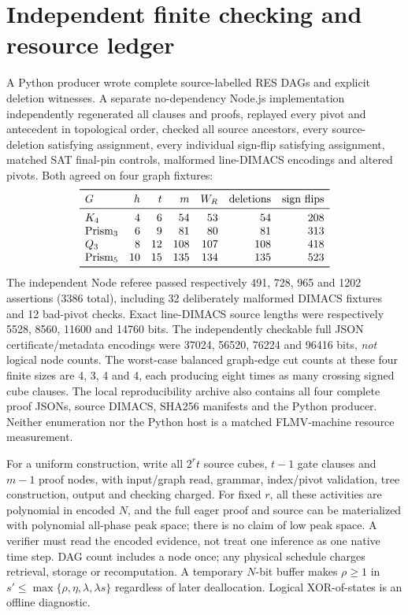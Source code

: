 \documentclass[11pt]{article}
\begin{document}
\section*{Independent finite checking and resource ledger}
A Python producer wrote complete source-labelled RES DAGs and explicit deletion witnesses. A separate no-dependency Node.js implementation independently regenerated all clauses and proofs, replayed every pivot and antecedent in topological order, checked all source ancestors, every source-deletion satisfying assignment, every individual sign-flip satisfying assignment, matched SAT final-pin controls, malformed line-DIMACS encodings and altered pivots. Both agreed on four graph fixtures:
\[
\begin{array}{lrrrrrr}
\toprule
G & h&t&m&W_R&\mathrm{deletions}&\mathrm{sign\ flips}\\
\midrule
K_4&4&6&54&53&54&208\\
\mathrm{Prism}_3&6&9&81&80&81&313\\
Q_3&8&12&108&107&108&418\\
\mathrm{Prism}_5&10&15&135&134&135&523\\
\bottomrule
\end{array}
\]
The independent Node referee passed respectively 491, 728, 965 and 1202 assertions (3386 total), including 32 deliberately malformed DIMACS fixtures and 12 bad-pivot checks. Exact line-DIMACS source lengths were respectively 5528, 8560, 11600 and 14760 bits. The independently checkable full JSON certificate/metadata encodings were 37024, 56520, 76224 and 96416 bits, \emph{not} logical node counts. The worst-case balanced graph-edge cut counts at these four finite sizes are 4, 3, 4 and 4, each producing eight times as many crossing signed cube clauses. The local reproducibility archive also contains all four complete proof JSONs, source DIMACS, SHA256 manifests and the Python producer. Neither enumeration nor the Python host is a matched FLMV-machine resource measurement.

For a uniform construction, write all $2^rt$ source cubes, $t-1$ gate clauses and $m-1$ proof nodes, with input/graph read, grammar, index/pivot validation, tree construction, output and checking charged. For fixed $r$, all these activities are polynomial in encoded $N$, and the full eager proof and source can be materialized with polynomial all-phase peak space; there is no claim of low peak space. A verifier must read the encoded evidence, not treat one inference as one native time step. DAG count includes a node once; any physical schedule charges retrieval, storage or recomputation. A temporary $N$-bit buffer makes $\rho\ge1$ in $s'\le\max\{\rho,\eta,\lambda,\lambda s\}$ regardless of later deallocation. Logical XOR-of-states is an offline diagnostic.
\end{document}
